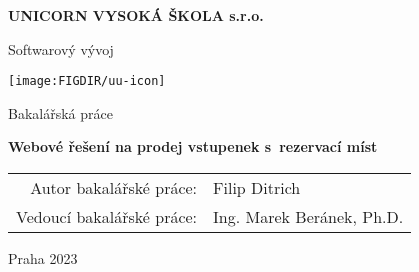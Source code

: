 \pagestyle{empty}
\begin{center}

{\bfseries\large UNICORN VYSOKÁ ŠKOLA s.r.o.}

    \vspace{5mm}

    {\Large Softwarový vývoj}

    \vfill
    \vspace{5mm}

    \centerline{\mbox{\texttt{[image: \\FIGDIR/uu-icon]}}}

    \vfill
    \vspace{5mm}

    {\large Bakalářská práce}

    \vspace{15mm}

    {\LARGE\bfseries Webové řešení na prodej vstupenek s~rezervací míst}

    \vfill

    \begin{tabular}{rl}
        Autor bakalářské práce:   & Filip Ditrich             \\
        \noalign{\vspace{2mm}}
        Vedoucí bakalářské práce: & Ing. Marek Beránek, Ph.D. \\
    \end{tabular}

    \vfill

    Praha 2023

\end{center}
